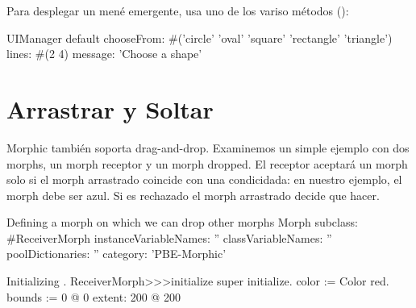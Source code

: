 \documentclass[a4paper,10pt,twoside]{book}
\begin{document}
Para desplegar un men\'e emergente, usa uno de los variso m\'etodos  ():
\begin{code}{}
UIManager default
	chooseFrom: #('circle' 'oval' 'square' 'rectangle' 'triangle')
	lines: #(2 4) message: 'Choose a shape'
\end{code}





\section{Arrastrar y Soltar}
Morphic tambi\'en soporta drag-and-drop. Examinemos un simple ejemplo con dos morphs, un morph receptor y un morph dropped. 
El receptor aceptar\'a un morph solo si el morph arrastrado coincide con una condici\on dada: en nuestro ejemplo, el morph debe ser azul. Si es rechazado el  morph arrastrado decide que hacer.

\begin{classdef}{Defining a morph on which we can drop other morphs}
Morph subclass: #ReceiverMorph
	instanceVariableNames: ''
	classVariableNames: ''
	poolDictionaries: ''
	category: 'PBE-Morphic'
\end{classdef}

\begin{method}{Initializing .}
ReceiverMorph>>>initialize
	super initialize.
	color := Color red.
	bounds := 0 @ 0 extent: 200 @ 200
\end{method}
\end{document}
